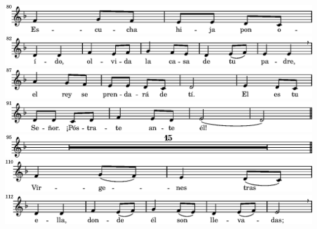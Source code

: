   \linebreak
\else
  \expandafter{}%
\fi
\includegraphics{b0/lily-2159aa8d-16}%
\ifx\betweenLilyPondSystem \undefined
  \linebreak
\else
  \expandafter{}%
\fi
\includegraphics{b0/lily-2159aa8d-17}%
\ifx\betweenLilyPondSystem \undefined
  \linebreak
\else
  \expandafter{}%
\fi
\includegraphics{b0/lily-2159aa8d-18}%
\ifx\betweenLilyPondSystem \undefined
  \linebreak
\else
  \expandafter{}%
\fi
\includegraphics{b0/lily-2159aa8d-19}%
\ifx\betweenLilyPondSystem \undefined
  \linebreak
\else
  \expandafter{}%
\fi
\includegraphics{b0/lily-2159aa8d-20}%
\ifx\betweenLilyPondSystem \undefined
  \linebreak
\else
  \expandafter{}%
\fi
\includegraphics{b0/lily-2159aa8d-21}%
\ifx\betweenLilyPondSystem \undefined
  \linebreak
\else
  \expandafter{}%
\fi
\includegraphics{b0/lily-2159aa8d-22}%
\ifx\betweenLilyPondSystem \undefined
  \linebreak
